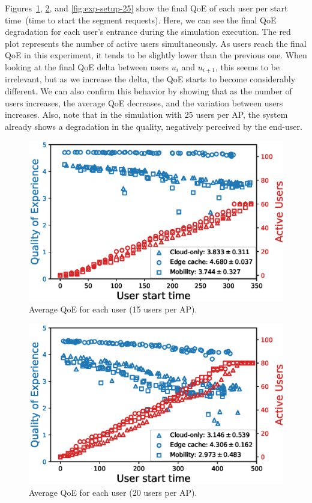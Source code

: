 Figures~\ref{fig:exp-setup-15}, \ref{fig:exp-setup-20}, and \ref{fig:exp-setup-25} show the final QoE of each user per start time~(time to start the segment requests). Here, we can see the final QoE degradation for each user's entrance during the simulation execution. The red plot represents the number of active users simultaneously. 
As users reach the final QoE in this experiment, it tends to be slightly lower than the previous one. When looking at the final QoE delta between users $u_{i}$ and $u_{i + 1}$, this seems to be irrelevant, but as we increase the delta, the QoE starts to become considerably different. We can also confirm this behavior by showing that as the number of users increases, the average QoE decreases, and the variation between users increases. Also, note that in the simulation with 25 users per AP, the system already shows a degradation in the quality, negatively perceived by the end-user.

\begin{figure}[!htb]
    \centering
    \includegraphics[width=\linewidth]{images/UserQoExUserStartTime15users-2.eps}
    \vspace{-0.4cm}
    \caption{Average QoE for each user (15 users per AP).}
    \label{fig:exp-setup-15}
\end{figure}

\begin{figure}[!htb]
    \centering
    \includegraphics[width=\linewidth]{images/UserQoExUserStartTime20users-2.eps}
    \vspace{-0.4cm}
    \caption{Average QoE for each user (20 users per AP).}
    \label{fig:exp-setup-20}
\end{figure}

